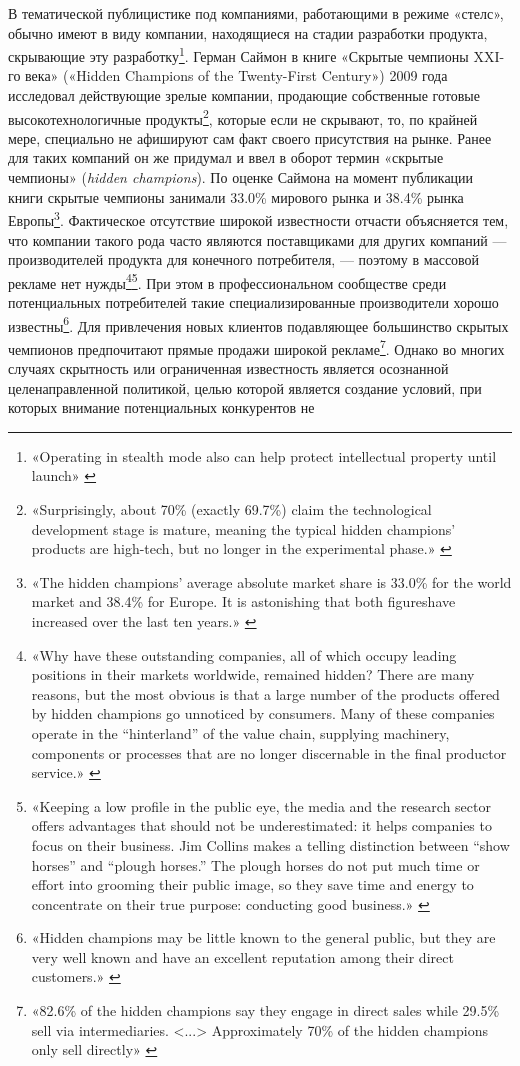 \documentclass{article}
\let\textitorig\textit
\renewcommand{\textit}[1]{{\fontfamily{cmr}\selectfont \textitorig{#1}}}
\begin{document}
В тематической публицистике под компаниями, работающими в режиме «стелс», обычно имеют в виду компании, находящиеся на стадии разработки продукта, скрывающие эту разработку\footnote{«Operating in stealth mode also can help protect intellectual property until launch» \cite{startupsStealth2013}}. Герман Саймон в книге «Скрытые чемпионы XXI-го века» («Hidden Champions of the Twenty-First Century») 2009 года исследовал действующие зрелые компании, продающие собственные готовые высокотехнологичные продукты\footnote{«Surprisingly, about 70\% (exactly 69.7\%) claim the technological development stage is mature, meaning the typical hidden champions’ products are high-tech, but no longer in the experimental phase.» \cite{hiddenChampions2009}}, которые если не скрывают, то, по крайней мере, специально не афишируют сам факт своего присутствия на рынке. Ранее для таких компаний он же придумал и ввел в оборот термин «скрытые чемпионы» (\textit{hidden champions}). По оценке Саймона на момент публикации книги скрытые чемпионы занимали 33.0\% мирового рынка и 38.4\% рынка Европы\footnote{«The hidden champions’ average absolute market share is 33.0\% for the world market and 38.4\% for Europe. It is astonishing that both figureshave increased over the last ten years.» \cite{hiddenChampions2009}}. Фактическое отсутствие широкой известности отчасти объясняется тем, что компании такого рода часто являются поставщиками для других компаний — производителей продукта для конечного потребителя, — поэтому в массовой рекламе нет нужды\footnote{«Why have these outstanding companies, all of which occupy leading positions in their markets worldwide, remained hidden? There are many reasons, but the most obvious is that a large number of the products offered by hidden champions go unnoticed by consumers. Many of these companies operate in the “hinterland” of the value chain, supplying machinery, components or processes that are no longer discernable in the final productor service.» \cite{hiddenChampions2009}}\footnote{«Keeping a low profile in the public eye, the media and the research sector offers advantages that should not be underestimated: it helps companies to focus on their business. Jim Collins makes a telling distinction between “show horses” and “plough horses.” The plough horses do not put much time or effort into grooming their public image, so they save time and energy to concentrate on their true purpose: conducting good business.» \cite{hiddenChampions2009}}. При этом в профессиональном сообществе среди потенциальных потребителей такие специализированные производители хорошо известны\footnote{«Hidden champions may be little known to the general public, but they are very well known and have an excellent reputation among their direct customers.» \cite{hiddenChampions2009}}. Для привлечения новых клиентов подавляющее большинство скрытых чемпионов предпочитают прямые продажи широкой рекламе\footnote{«82.6\% of the hidden champions say they engage in direct sales while 29.5\% sell via intermediaries. <...> Approximately 70\% of the hidden champions only sell directly» \cite{hiddenChampions2009}}. Однако во многих случаях скрытность или ограниченная известность является осознанной целенаправленной политикой, целью которой является создание условий, при которых внимание потенциальных конкурентов не 
\end{document}
